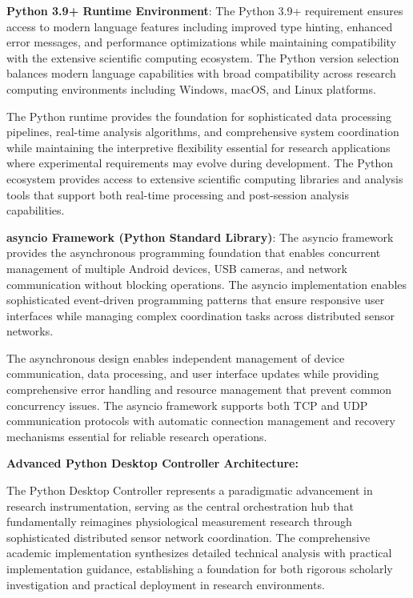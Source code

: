 \documentclass[11pt,a4paper]{report}
\begin{document}
\textbf{Python 3.9+ Runtime Environment}: The Python 3.9+ requirement ensures access to modern language features including
improved type hinting, enhanced error messages, and performance optimizations while maintaining compatibility with the
extensive scientific computing ecosystem. The Python version selection balances modern language capabilities with broad
compatibility across research computing environments including Windows, macOS, and Linux platforms.

The Python runtime provides the foundation for sophisticated data processing pipelines, real-time analysis algorithms,
and comprehensive system coordination while maintaining the interpretive flexibility essential for research applications
where experimental requirements may evolve during development. The Python ecosystem provides access to extensive
scientific computing libraries and analysis tools that support both real-time processing and post-session analysis
capabilities.

\textbf{asyncio Framework (Python Standard Library)}: The asyncio framework provides the asynchronous programming foundation
that enables concurrent management of multiple Android devices, USB cameras, and network communication without blocking
operations. The asyncio implementation enables sophisticated event-driven programming patterns that ensure responsive
user interfaces while managing complex coordination tasks across distributed sensor networks.

The asynchronous design enables independent management of device communication, data processing, and user interface
updates while providing comprehensive error handling and resource management that prevent common concurrency issues. The
asyncio framework supports both TCP and UDP communication protocols with automatic connection management and recovery
mechanisms essential for reliable research operations.

\textbf{Advanced Python Desktop Controller Architecture:}

The Python Desktop Controller represents a paradigmatic advancement in research instrumentation, serving as the central
orchestration hub that fundamentally reimagines physiological measurement research through sophisticated distributed
sensor network coordination. The comprehensive academic implementation synthesizes detailed technical analysis with
practical implementation guidance, establishing a foundation for both rigorous scholarly investigation and practical
deployment in research environments.
\end{document}
